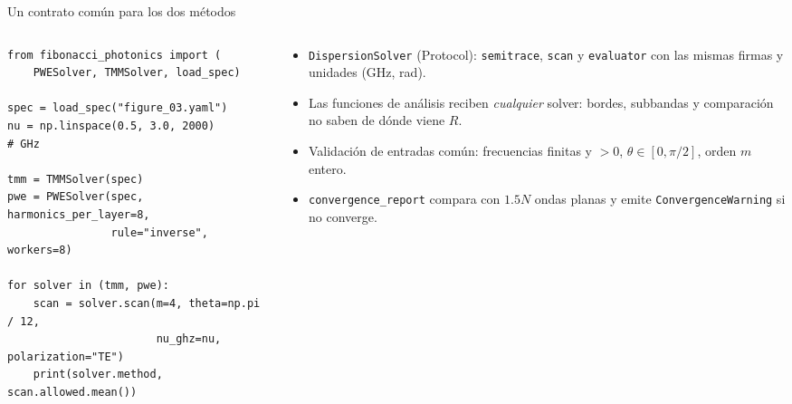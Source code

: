 \documentclass[aspectratio=169,10pt]{beamer}
\begin{document}
\begin{frame}[fragile]{Un contrato común para los dos métodos}
  \begin{columns}[T]
    \begin{column}{0.52\textwidth}
\begin{lstlisting}
from fibonacci_photonics import (
    PWESolver, TMMSolver, load_spec)

spec = load_spec("figure_03.yaml")
nu = np.linspace(0.5, 3.0, 2000)          # GHz

tmm = TMMSolver(spec)
pwe = PWESolver(spec, harmonics_per_layer=8,
                rule="inverse", workers=8)

for solver in (tmm, pwe):
    scan = solver.scan(m=4, theta=np.pi / 12,
                       nu_ghz=nu, polarization="TE")
    print(solver.method, scan.allowed.mean())
\end{lstlisting}
    \end{column}
    \begin{column}{0.46\textwidth}
      \small
      \begin{itemize}
        \item \texttt{DispersionSolver} (Protocol): \texttt{semitrace}, \texttt{scan} y \texttt{evaluator}
          con las mismas firmas y unidades (GHz, rad).
        \item Las funciones de análisis reciben \emph{cualquier} solver: bordes, subbandas y comparación no saben de
          dónde viene $R$.
        \item Validación de entradas común: frecuencias finitas y $>0$, $\theta\in[0,\pi/2]$, orden $m$ entero.
        \item \texttt{convergence\_report} compara con $1.5N$ ondas planas y emite \texttt{ConvergenceWarning} si no
          converge.
      \end{itemize}
    \end{column}
  \end{columns}
\end{frame}
\end{document}
